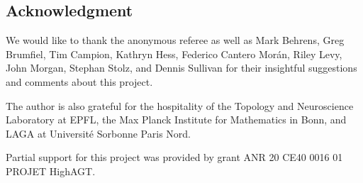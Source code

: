 
\subsection*{Acknowledgment}

We would like to thank the anonymous referee as well as Mark Behrens, Greg Brumfiel, Tim Campion, Kathryn Hess, Federico Cantero Mor\'an, Riley Levy, John Morgan, Stephan Stolz, and Dennis Sullivan for their insightful suggestions and comments about this project.

The author is also grateful for the hospitality of the Topology and Neuroscience Laboratory at EPFL, the Max Planck Institute for Mathematics in Bonn, and LAGA at Universit\'e Sorbonne Paris Nord.

Partial support for this project was provided by grant ANR 20 CE40 0016 01 PROJET HighAGT.